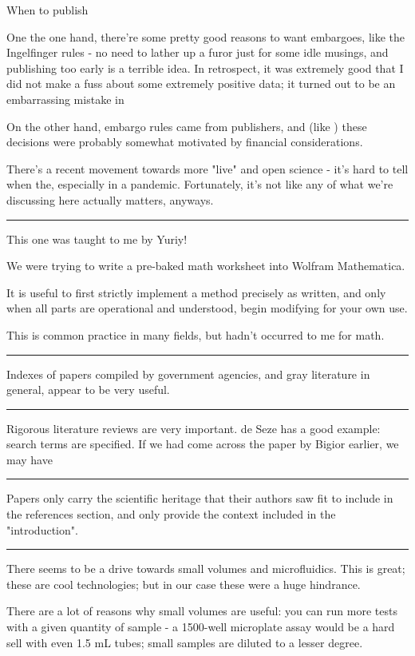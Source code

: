 \documentclass[paper.tex]{subfiles}
\begin{document}
When to publish

One the one hand, there're some pretty good reasons to want embargoes, like the Ingelfinger rules - no need to lather up a furor just for some idle musings, and publishing too early is a terrible idea. In retrospect, it was extremely good that I did not make a fuss about some extremely positive data; it turned out to be an embarrassing mistake in 

On the other hand, embargo rules came from publishers, and (like ) these decisions were probably somewhat motivated by financial considerations.

There's a recent movement towards more "live" and open science - it's hard to tell when the, especially in a pandemic. Fortunately, it's not like any of what we're discussing here actually matters, anyways.

\rule{\linewidth}{0.2pt}

This one was taught to me by Yuriy!

We were trying to write a pre-baked math worksheet into Wolfram Mathematica.

It is useful to first strictly implement a method precisely as written, and only when all parts are operational and understood, begin modifying for your own use.

This is common practice in many fields, but hadn't occurred to me for math. 

\rule{\linewidth}{0.2pt}

Indexes of papers compiled by government agencies, and gray literature in general, appear to be very useful.

\rule{\linewidth}{0.2pt}

Rigorous literature reviews are very important. de Seze has a good example: search terms are specified. If we had come across the paper by Bigior earlier, we may have

\rule{\linewidth}{0.2pt}

Papers only carry the scientific heritage that their authors saw fit to include in the references section, and only provide the context included in the "introduction". 

\rule{\linewidth}{0.2pt}

There seems to be a drive towards small volumes and microfluidics. This is great; these are cool technologies; but in our case these were a huge hindrance.

There are a lot of reasons why small volumes are useful: you can run more tests with a given quantity of sample - a 1500-well microplate assay would be a hard sell with even 1.5 mL tubes; small samples are diluted to a lesser degree. 
\end{document}
